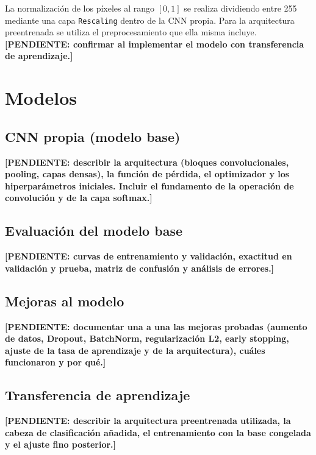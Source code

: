 \documentclass[letterpaper, 10 pt, conference]{ieeeconf}
\newcommand{\pendiente}[1]{\textbf{[PENDIENTE: #1]}}
\begin{document}
La normalización de los píxeles al rango $[0,1]$ se realiza dividiendo entre 255 mediante una capa \texttt{Rescaling} dentro de la CNN propia. Para la arquitectura preentrenada se utiliza el preprocesamiento que ella misma incluye. \pendiente{confirmar al implementar el modelo con transferencia de aprendizaje.}


\section{Modelos}

\subsection{CNN propia (modelo base)}

\pendiente{describir la arquitectura (bloques convolucionales, pooling, capas densas), la función de pérdida, el optimizador y los hiperparámetros iniciales. Incluir el fundamento de la operación de convolución y de la capa softmax.}

\subsection{Evaluación del modelo base}

\pendiente{curvas de entrenamiento y validación, exactitud en validación y prueba, matriz de confusión y análisis de errores.}

\subsection{Mejoras al modelo}

\pendiente{documentar una a una las mejoras probadas (aumento de datos, Dropout, BatchNorm, regularización L2, early stopping, ajuste de la tasa de aprendizaje y de la arquitectura), cuáles funcionaron y por qué.}

\subsection{Transferencia de aprendizaje}

\pendiente{describir la arquitectura preentrenada utilizada, la cabeza de clasificación añadida, el entrenamiento con la base congelada y el ajuste fino posterior.}
\end{document}

